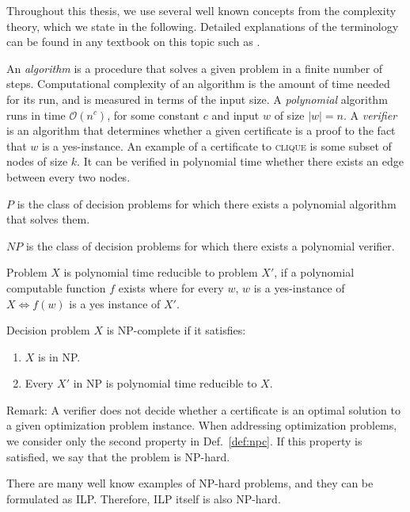 Throughout this thesis, we use several well known concepts from the complexity theory, which we state in the following.
Detailed explanations of the terminology can be found in any textbook on this topic such as \cite{sipser06}.

An \emph{algorithm} is a procedure that solves a given problem in a finite number of steps.
Computational complexity of an algorithm is the amount of time needed for its run, and is measured in terms of the input size.
A \emph{polynomial} algorithm runs in time $\mathcal{O}(n^c)$, for some constant $c$ and input $w$ of size $|w|=n$.
A \emph{verifier} is an algorithm that determines whether a given certificate is a proof to the fact that $w$ is a yes-instance.
An example of a certificate to \textsc{clique} is some subset of nodes of size $k$.
It can be verified in polynomial time whether there exists an edge between every two nodes.
\begin{definition}
	$P$ is the class of decision problems for which there exists a polynomial algorithm that solves them.
\end{definition}
\begin{definition}
	$NP$ is the class of decision problems for which there exists a polynomial verifier. 
\end{definition}
\begin{definition}
	Problem $X$ is polynomial time reducible to problem $X'$, if a polynomial computable function $f$ exists where for every $w$, 
	$w$ is a yes-instance of $X\Leftrightarrow f(w)$ is a yes instance of $X'$.
\end{definition}
\begin{definition}\label{def:npc}
	Decision problem $X$ is NP-complete if it satisfies:
	\begin{enumerate}
		\item $X$ is in NP.
		\item Every $X'$ in NP is polynomial time reducible to $X$.
	\end{enumerate}
\end{definition}
Remark:
A verifier does not decide whether a certificate is an optimal solution to a given optimization problem instance. 
When addressing optimization problems, we consider only the second property in Def.~\ref{def:npc}. 
If this property is satisfied, we say that the problem is NP-hard.

There are many well know examples of NP-hard problems, and they can be formulated as ILP.
Therefore, ILP itself is also NP-hard.

